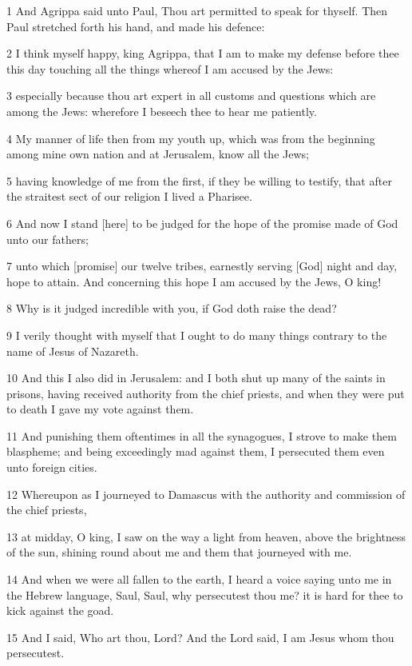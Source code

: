 \par 1 And Agrippa said unto Paul, Thou art permitted to speak for thyself. Then Paul stretched forth his hand, and made his defence:
\par 2 I think myself happy, king Agrippa, that I am to make my defense before thee this day touching all the things whereof I am accused by the Jews:
\par 3 especially because thou art expert in all customs and questions which are among the Jews: wherefore I beseech thee to hear me patiently.
\par 4 My manner of life then from my youth up, which was from the beginning among mine own nation and at Jerusalem, know all the Jews;
\par 5 having knowledge of me from the first, if they be willing to testify, that after the straitest sect of our religion I lived a Pharisee.
\par 6 And now I stand [here] to be judged for the hope of the promise made of God unto our fathers;
\par 7 unto which [promise] our twelve tribes, earnestly serving [God] night and day, hope to attain. And concerning this hope I am accused by the Jews, O king!
\par 8 Why is it judged incredible with you, if God doth raise the dead?
\par 9 I verily thought with myself that I ought to do many things contrary to the name of Jesus of Nazareth.
\par 10 And this I also did in Jerusalem: and I both shut up many of the saints in prisons, having received authority from the chief priests, and when they were put to death I gave my vote against them.
\par 11 And punishing them oftentimes in all the synagogues, I strove to make them blaspheme; and being exceedingly mad against them, I persecuted them even unto foreign cities.
\par 12 Whereupon as I journeyed to Damascus with the authority and commission of the chief priests,
\par 13 at midday, O king, I saw on the way a light from heaven, above the brightness of the sun, shining round about me and them that journeyed with me.
\par 14 And when we were all fallen to the earth, I heard a voice saying unto me in the Hebrew language, Saul, Saul, why persecutest thou me? it is hard for thee to kick against the goad.
\par 15 And I said, Who art thou, Lord? And the Lord said, I am Jesus whom thou persecutest.
